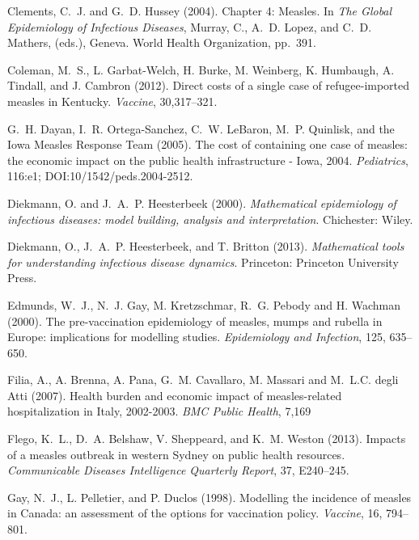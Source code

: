 \documentclass{article}
\begin{document}
\begin{thebibliography}{}
Clements, C.~J. and G.~D. Hussey (2004).
\newblock Chapter 4: Measles.
\newblock In \emph{The Global Epidemiology of Infectious Diseases},  Murray, C., A.~D. Lopez, and C.~D. Mathers, (eds.), Geneva.
World Health Organization, pp.~391.

Coleman, M.~S., L. Garbat-Welch, H. Burke, M. Weinberg, K. Humbaugh, A. Tindall, and J. Cambron (2012).
\newblock Direct costs of a single case of refugee-imported measles in Kentucky.
\newblock \emph{Vaccine}, 30,317--321.

G.~H. Dayan, I.~R. Ortega-Sanchez, C.~W. LeBaron, M.~P. Quinlisk, and the Iowa Measles Response Team (2005).
\newblock The cost of containing one case of measles: the economic impact on the public health infrastructure - Iowa, 2004.
\newblock \emph{Pediatrics}, 116:e1; DOI:10/1542/peds.2004-2512.

Diekmann, O. and  J.~A.~P. Heesterbeek (2000).
\newblock \emph{Mathematical epidemiology of infectious diseases: model building, analysis and interpretation}.
Chichester: Wiley.

Diekmann, O.,  J.~A.~P. Heesterbeek, and T. Britton (2013).
\newblock \emph{Mathematical tools for understanding infectious disease dynamics}.
Princeton: Princeton University Press.

Edmunds, W.~J., N.~J. Gay, M. Kretzschmar, R.~G. Pebody and H. Wachman (2000).
\newblock The pre-vaccination epidemiology of measles, mumps and rubella in Europe: implications for modelling studies.
\newblock \emph{Epidemiology and Infection}, 125, 635--650.

Filia, A., A. Brenna, A. Pana, G.~M. Cavallaro, M. Massari and M.~L.C. degli Atti (2007).
\newblock Health burden and economic impact of measles-related hospitalization in Italy, 2002-2003.
\newblock \emph{BMC Public Health}, 7,169

Flego, K.~L., D.~A. Belshaw, V. Sheppeard, and K.~M. Weston (2013).
\newblock Impacts of a measles outbreak in western Sydney on public health resources.
\newblock \emph{Communicable Diseases Intelligence Quarterly Report}, 37, E240--245.

Gay, N.~J., L. Pelletier, and P. Duclos (1998).
\newblock Modelling the incidence of measles in Canada: an assessment of the options for vaccination policy.
\newblock \emph{Vaccine}, 16, 794--801.


\end{thebibliography}
\end{document}
